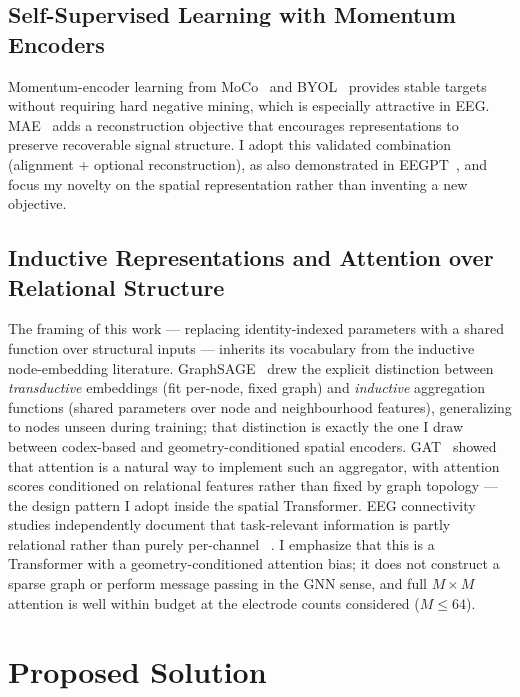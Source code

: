 \documentclass[11pt]{article}
\begin{document}
\subsection{Self-Supervised Learning with Momentum Encoders}
Momentum-encoder learning from MoCo~\cite{he2020moco} and
BYOL~\cite{grill2020byol} provides stable targets without requiring hard
negative mining, which is especially attractive in EEG.
MAE~\cite{he2022mae} adds a reconstruction objective that encourages
representations to preserve recoverable signal structure. I adopt this
validated combination (alignment + optional reconstruction), as also
demonstrated in EEGPT~\cite{wang2024eegpt}, and focus my novelty on the
spatial representation rather than inventing a new objective.

\subsection{Inductive Representations and Attention over Relational Structure}
The framing of this work --- replacing identity-indexed parameters with a
shared function over structural inputs --- inherits its vocabulary from the
inductive node-embedding literature.
GraphSAGE~\cite{hamilton2017graphsage} drew the explicit distinction between
\emph{transductive} embeddings (fit per-node, fixed graph) and
\emph{inductive} aggregation functions (shared parameters over node and
neighbourhood features), generalizing to nodes unseen during training; that
distinction is exactly the one I draw between codex-based and
geometry-conditioned spatial encoders.
GAT~\cite{velickovic2018gat} showed that attention is a natural way to
implement such an aggregator, with attention scores conditioned on
relational features rather than fixed by graph topology --- the design
pattern I adopt inside the spatial Transformer.
EEG connectivity studies independently document that task-relevant
information is partly relational rather than purely per-channel
~\cite{bastos2016connectivity}.
I emphasize that this is a Transformer with a geometry-conditioned attention
bias; it does not construct a sparse graph or perform message passing in the
GNN sense, and full $M \times M$ attention is well within budget at the
electrode counts considered ($M \leq 64$).

\section{Proposed Solution}
\label{sec:solution}
\end{document}
